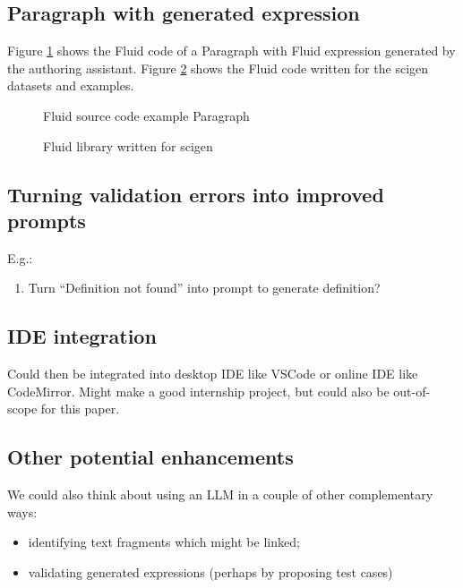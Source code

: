 \subsection{Paragraph with generated expression}
\label{subsec:paragraph-with-generated-expression}
Figure \ref{fig:fluid-example-paragraph} shows the Fluid code of a Paragraph with Fluid expression generated by the authoring assistant.
Figure \ref{fig:fluid-scigen} shows the Fluid code written for the scigen datasets and examples.
\begin{figure}[h]
    \small
    {}
    \vspace{-0.5em}
    \caption{Fluid source code example Paragraph}
    \label{fig:fluid-example-paragraph}
\end{figure}

\begin{figure}[h]
    \small
    {}
    \vspace{-0.5em}
    \caption{Fluid library written for scigen}
    \label{fig:fluid-scigen}
\end{figure}

\subsection{Turning validation errors into improved prompts}\label{subsec:turning-validation-errors-into-improved-prompts}
E.g.:
\begin{enumerate}
\item Turn ``Definition not found'' into prompt to generate definition?
\end{enumerate}

\subsection{IDE integration}\label{subsec:ide-integration}

Could then be integrated into desktop IDE like VSCode or online IDE like CodeMirror. Might make a good
internship project, but could also be out-of-scope for this paper.

\subsection{Other potential enhancements}\label{subsec:other-potential-enhancements}

We could also think about using an LLM in a couple of other complementary ways:
\begin{itemize}
\item identifying text fragments which might be linked;
\item validating generated expressions (perhaps by proposing test cases)
\end{itemize}



